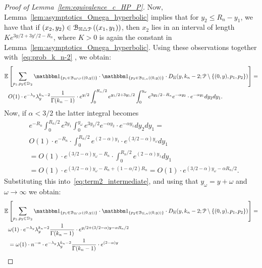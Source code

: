 \begin{proof}[Proof of Lemma~\ref{lem:equivalence_c_HP_P}]
Now, Lemma~\ref{lem:asymptotics_Omega_hyperbolic} implies that for 
$y_2 \leq R_n -y_1$, we have that if 
$(x_2,y_2) \in {\mathcal B}_{\mathbb{H} \bigtriangleup {\mathcal P}}\left((x_1,y_1)\right)$, then $x_2$ lies in an interval of length 
$Ke^{3 y/2 + 3y'/2 - R_n}$, where $K >0$ is again the constant in Lemma~\ref{lem:asymptotics_Omega_hyperbolic}. 
Using these observations together with~\eqref{eq:prob_k_n-2} , we obtain: 
\begin{equation} \label{eq:term2_intermediate}
\begin{split}
{\mathbb E}& \left[  \sum_{p_1, p_2\in \dom{2}} \ind{p_1 \in \BallInter{(0,y)}} \cdot \ind{p_2 \in \BallHyp{(0,y)}} \cdot 
D_\H (y,k_n-2;\Pcal \setminus \{ (0,y),p_1,p_2\})  \right] = \\
& O(1) \cdot e^{-\lambda_y} \lambda_y^{k_n-2} \frac{1}{\Gamma (k_n-1)} \cdot 
e^{y/2}\int_0^{R_n/2} e^{y_1/2 + 3y_1/2}\int_0^{y_\omega} e^{3y_2/2 - R_n} e^{-\alpha y_2} \cdot e^{-\alpha y_1} dy_2 dy_1. 
\end{split}
\end{equation} 
Now, if $\alpha < 3/2$ the latter integral becomes
\begin{equation*}
\begin{split}
& e^{-R_n} \int_0^{R_n/2} e^{2 y_1}\int_0^{y_\omega} e^{3y_2/2} e^{-\alpha y_2} \cdot e^{-\alpha y_1} dy_2 dy_1 = \\
&  O(1) \cdot e^{-R_n} \cdot  \int_0^{R_n/2} e^{(2-\alpha )y_1} \cdot 
e^{(3/2 - \alpha) y_\omega} dy_1 \\
& =O(1) \cdot e^{(3/2 - \alpha) y_\omega - R_n} \cdot \int_0^{R_n/2} e^{(2-\alpha) y_1} d y_1 \\
& =O(1) \cdot e^{(3/2 - \alpha) y_\omega - R_n+ (1 - \alpha/2) R_n } 
=O(1) \cdot e^{(3/2 - \alpha) y_\omega - \alpha R_n/2}. 
\end{split}
\end{equation*}
Substituting this into~\eqref{eq:term2_intermediate}, and using that 
$y_\omega = y + \omega$ and $\omega \to \infty$
we obtain: 
\begin{equation*}
\begin{split}
{\mathbb E}& \left[  \sum_{p_1, p_2\in \dom{2}} \ind{p_1 \in \BallInter{(0,y)}} \cdot \ind{p_2 \in \BallHyp{(0,y)}} \cdot 
D_\H (y,k_n-2;\Pcal \setminus \{ (0,y),p_1,p_2\})  \right] = \\
& \omega(1) \cdot e^{-\lambda_y} \lambda_y^{k_n-2} \frac{1}{\Gamma (k_n-1)} \cdot 
e^{y/2+(3/2 - \alpha) y - \alpha R_n/2} \\
&= \omega(1) \cdot n^{-\alpha} \cdot e^{-\lambda_y} \lambda_y^{k_n-2} \frac{1}{\Gamma (k_n-1)} \cdot e^{(2 - \alpha) y} 

\end{split}
\end{equation*}
\end{proof}
